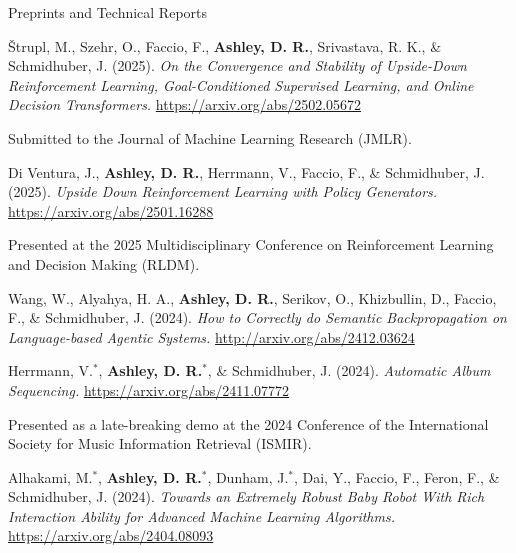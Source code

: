 \documentclass{cv}
\begin{document}

\begin{rSection}{Preprints and Technical Reports}

\begin{rPublications}
    \item
        {\v{S}}trupl, M., Szehr, O., Faccio, F., \textbf{Ashley, D. R.}, Srivastava, R. K., \& Schmidhuber, J.
        (2025).
        \textit{On the Convergence and Stability of Upside-Down Reinforcement Learning, Goal-Conditioned Supervised Learning, and Online Decision Transformers.}
        \url{https://arxiv.org/abs/2502.05672}

        \vspace{-0.4em}
        Submitted to the Journal of Machine Learning Research (JMLR).
    \item
        Di Ventura, J., \textbf{Ashley, D. R.}, Herrmann, V., Faccio, F., \& Schmidhuber, J.
        (2025).
        \textit{Upside Down Reinforcement Learning with Policy Generators.}
        \url{https://arxiv.org/abs/2501.16288}

        \vspace{-0.4em}
        Presented at the 2025 Multidisciplinary Conference on Reinforcement Learning and Decision Making (RLDM).
    \item
        Wang, W., Alyahya, H. A., \textbf{Ashley, D. R.}, Serikov, O., Khizbullin, D., Faccio, F., \& Schmidhuber, J.
        (2024).
        \textit{How to Correctly do Semantic Backpropagation on Language-based Agentic Systems.}
        \url{http://arxiv.org/abs/2412.03624}
    \item
        Herrmann, V.$^*$, \textbf{Ashley, D. R.}$^*$, \& Schmidhuber, J.
        (2024).
        \textit{Automatic Album Sequencing.}
        \url{https://arxiv.org/abs/2411.07772}

        \vspace{-0.4em}
        Presented as a late-breaking demo at the 2024 Conference of the International Society for Music Information Retrieval (ISMIR).
    \item
        Alhakami, M.$^*$, \textbf{Ashley, D. R.}$^*$, Dunham, J.$^*$, Dai, Y., Faccio, F., Feron, F., \& Schmidhuber, J.
        (2024).
        \textit{Towards an Extremely Robust Baby Robot With Rich Interaction Ability for Advanced Machine Learning Algorithms.}
        \url{https://arxiv.org/abs/2404.08093}


\end{rPublications}
\end{rSection}
\end{document}
